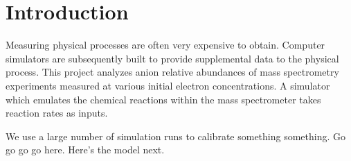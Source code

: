 \section{Introduction}

Measuring physical processes are often very expensive to obtain. Computer simulators are subsequently built to provide supplemental data to the physical process. This project analyzes anion relative abundances of mass spectrometry experiments measured at various initial electron concentrations. A simulator which emulates the chemical reactions within the mass spectrometer takes reaction rates as inputs.

We use a large number of simulation runs to calibrate something something. Go go go go here. Here's the model next.
